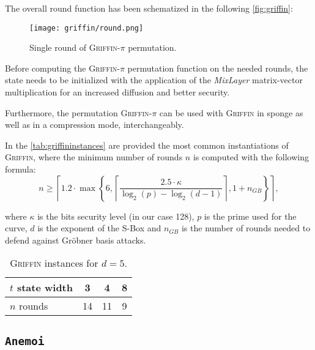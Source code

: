 \documentclass[12pt, a4paper]{report}
\begin{document}
The overall round function has been schematized in the following \autoref{fig:griffin}:
\begin{figure}[H]
  \begin{center}
    \texttt{[image: griffin/round.png]}
  \end{center}
  \caption{Single round of \textsc{Griffin-$\pi$} permutation.}\label{fig:griffin}
\end{figure}

Before computing the \textsc{Griffin-$\pi$} permutation function on the needed rounds, the state needs to be initialized with the application of the \textit{MixLayer} matrix-vector multiplication for an increased diffusion and better security.

Furthermore, the permutation \textsc{Griffin-$\pi$} can be used with \textsc{Griffin} in sponge as well as in a compression mode, interchangeably. 

In the \autoref{tab:griffininstances} are provided the most common instantiations of \textsc{Griffin}, where the minimum number of rounds $n$ is computed with the following formula:
\begin{equation}
  n \ge \left\lceil 1.2 \cdot \max \left\{6, \left\lceil \frac{2.5 \cdot \kappa}{\log_2(p) - \log_2(d-1)} \right\rceil, 1 + n_{GB} \right\} \right\rceil,
  \label{eq:griffinrounds}
\end{equation}

where $\kappa$ is the bits security level (in our case 128), $p$ is the prime used for the curve, $d$ is the exponent of the S-Box and $n_{GB}$ is the number of rounds needed to defend against Gr\"obner basis attacks.

\begin{table}[H]
  \caption{\textsc{Griffin} instances for $d = 5$.}\label{tab:griffininstances}
  \begin{center}
    \begin{tabular}{|l|c|c|c|}
      \hline
      $t$ state width & 3 & 4 & 8 \\
      \hline
      $n$ rounds & 14 & 11 & 9 \\
      \hline
    \end{tabular}
  \end{center}
\end{table}

\subsection{\texttt{Anemoi}}\label{subsec:anemoi}
\end{document}
